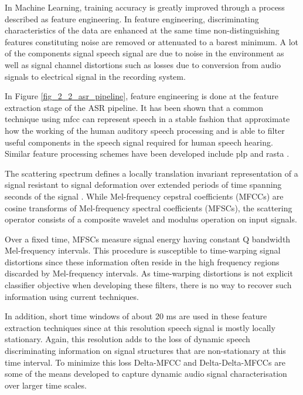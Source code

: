 In Machine Learning, training accuracy is greatly improved through a process described as feature engineering.  In feature engineering, discriminating characteristics of the data are enhanced at the same time non-distinguishing features constituting noise are removed or attenuated to a barest minimum.  A lot of the components signal speech signal are due to noise in the environment as well as signal channel distortions such as losses due to conversion from audio signals to electrical signal in the recording system.

In Figure \ref{fig_2_2_asr_pipeline}, feature engineering is done at the feature extraction stage of the ASR pipeline. It has been shown that a common technique using \acrfull{mfcc} \citep{davis1980comparison} can represent speech in a stable fashion that approximate how the working of the human auditory speech processing and is able to filter useful components in the speech signal required for human speech hearing. Similar feature processing schemes have been developed include \acrfull{plp} \citep{hermansky1990perceptual} and \acrfull{rasta} \citep{hermansky1994rasta}. 

The scattering spectrum defines a locally translation invariant representation of a signal resistant to signal deformation over extended periods of time spanning seconds of the signal \citep{anden2014deep}. While Mel-frequency cepstral coefficients (MFCCs) are cosine transforms of Mel-frequency spectral coefficients (MFSCs), the scattering operator consists of a composite wavelet and modulus operation on input signals. 

Over a fixed time, MFSCs measure signal energy having constant Q bandwidth Mel-frequency intervals.  This procedure is susceptible to time-warping signal distortions since these information often reside in the high frequency regions discarded by Mel-frequency intervals.  As time-warping distortions is not explicit classifier objective when developing these filters, there is no way to recover such information using current techniques. 

In addition, short time windows of about 20 ms are used in these feature extraction techniques since at this resolution speech signal is mostly locally stationary.  Again, this resolution adds to the loss of dynamic speech discriminating information on signal structures that are non-stationary at this time interval. To minimize this loss Delta-MFCC and Delta-Delta-MFCCs \citep{furui1986speaker} are some of the means developed to capture dynamic audio signal characterisation over  larger time scales.

